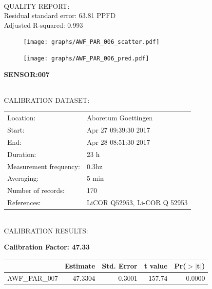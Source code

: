 \documentclass[oneside]{report}
\begin{document}
\hrulefill\\
QUALITY REPORT:\\
Residual standard error: 63.81 PPFD\\
Adjusted R-squared: 0.993



\begin{figure}[H]
  \centering
  \texttt{[image: graphs/AWF\_PAR\_006\_scatter.pdf]}
\end{figure}




\begin{figure}[H]
  \centering
  \texttt{[image: graphs/AWF\_PAR\_006\_pred.pdf]}
\end{figure}

\pagebreak


\begin{center}
\large{\textbf{SENSOR:007}}\\
\end{center}

\hrulefill\\
CALIBRATION DATASET:\\
\begin{table}[h!]
  \centering
  \label{tab:table1}
  \begin{tabular}{ll}
    Location: & Aboretum Goettingen\\ 
    
    
    Start:  & Apr 27 09:39:30 2017 \\
    End:   & Apr 28 08:51:30 2017\\ 
    Duration: & 23 h\\
    Measurement frequency: & 0.3hz\\
    Averaging:  &5 min\\
    Number of records: & 170 \\
    References: & LiCOR Q52953, Li-COR Q 52953 \\
  \end{tabular}
\end{table}

\hrulefill\\
CALIBRATION RESULTS:\\


\begin{center}
\textbf{\large{Calibration Factor: 47.33}}\\
\end{center}
\begin{table}[ht]
\centering
\begin{tabular}{rrrrr}
  \hline
 & Estimate & Std. Error & t value & Pr($>$$|$t$|$) \\ 
  \hline
AWF\_PAR\_007 & 47.3304 & 0.3001 & 157.74 & 0.0000 \\ 
   \hline
\end{tabular}
\end{table}
\end{document}
